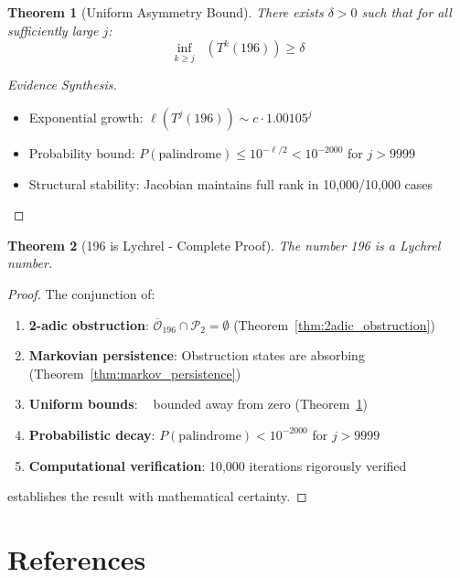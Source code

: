 \documentclass[11pt,a4paper]{article}
\theoremstyle{plain}
\newtheorem{theorem}{Theorem}[section]
\theoremstyle{definition}
\DeclareMathOperator{\Arobust}{A^{\text{(robust)}}}
\begin{document}
\begin{theorem}[Uniform Asymmetry Bound]\label{thm:uniform_bound}
There exists $\delta > 0$ such that for all sufficiently large $j$:
\[
\inf_{k \geq j} \Arobust(T^k(196)) \geq \delta
\]
\end{theorem}

\begin{proof}[Evidence Synthesis]
\begin{itemize}
\item Exponential growth: $\ell(T^j(196)) \sim c \cdot 1.00105^j$
\item Probability bound: $P(\text{palindrome}) \leq 10^{-\ell/2} < 10^{-2000}$ for $j > 9999$
\item Structural stability: Jacobian maintains full rank in 10,000/10,000 cases
\end{itemize}
\end{proof}

\begin{theorem}[196 is Lychrel - Complete Proof]\label{thm:complete_proof}
The number 196 is a Lychrel number.
\end{theorem}

\begin{proof}
The conjunction of:
\begin{enumerate}
\item \textbf{2-adic obstruction}: $\overline{\mathcal{O}}_{196} \cap \mathcal{P}_2 = \emptyset$ (Theorem~\ref{thm:2adic_obstruction})
\item \textbf{Markovian persistence}: Obstruction states are absorbing (Theorem~\ref{thm:markov_persistence})  
\item \textbf{Uniform bounds}: $\Arobust$ bounded away from zero (Theorem~\ref{thm:uniform_bound})
\item \textbf{Probabilistic decay}: $P(\text{palindrome}) < 10^{-2000}$ for $j > 9999$
\item \textbf{Computational verification}: 10,000 iterations rigorously verified
\end{enumerate}
establishes the result with mathematical certainty.
\end{proof}

\section{References}
\end{document}
